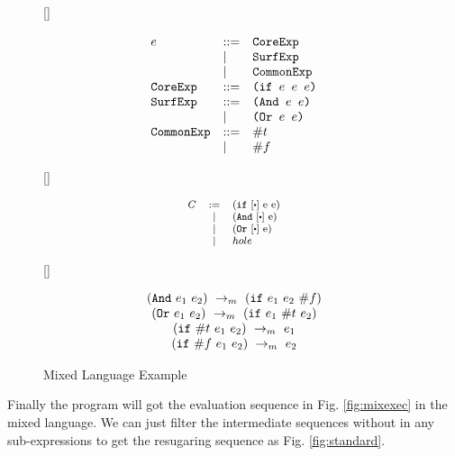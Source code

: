 \begin{figure}[thb]
\centering
{}[\linewidth]{\footnotesize
\begin{flushleft}
\[
\begin{array}{lll}
e &::=& \mbox{\tt CoreExp} \\
&|&\mbox{\tt SurfExp}\\
&|&\mbox{\tt CommonExp}\\
\mbox{\tt CoreExp} &::=& \texttt{(if~$e$~$e$~$e$)}\\
\mbox{\tt SurfExp} &::=& \texttt{(And~$e$~$e$)}\\
&|&\texttt{(Or~$e$~$e$)}\\
\mbox{\tt CommonExp} &::=& \#t\\
&|& \#f\\
\end{array}
\]
\end{flushleft}

}
[\linewidth]{
\begin{flushleft}
\[\footnotesize
\begin{array}{lcl}
C &:=& (\m{if}~[\bigcdot]~$e$~$e$)\\
&|& (\m{And}~[\bigcdot]~$e$)\\
&|& (\m{Or}~[\bigcdot]~$e$)\\
&|&hole\\
\end{array}
\]
\end{flushleft}

}

[\linewidth]{\footnotesize
\begin{flushleft}
\[
\begin{array}{c}
(\mbox{\tt And}~e_1~e_2) ~\rightarrow_m~(\mbox{\tt if}~e_1~e_2~\#f)\\
(\mbox{\tt Or}~e_1~e_2) ~\rightarrow_m~(\mbox{\tt if}~e_1~\#t~e_2)\\
(\mbox{\tt if}~\#t~e_1~e_2) ~\rightarrow_m~e_1\\
(\mbox{\tt if}~\#f~e_1~e_2) ~\rightarrow_m~e_2 
\end{array}
\]
\end{flushleft}

}

\caption{Mixed Language Example}
\label{fig:mixexample}
\end{figure}

Finally the program  will got the evaluation sequence in Fig.  \ref{fig:mixexec} in the mixed language. We can just filter the intermediate sequences without  in any sub-expressions to get the resugaring sequence as Fig.  \ref{fig:standard}.

